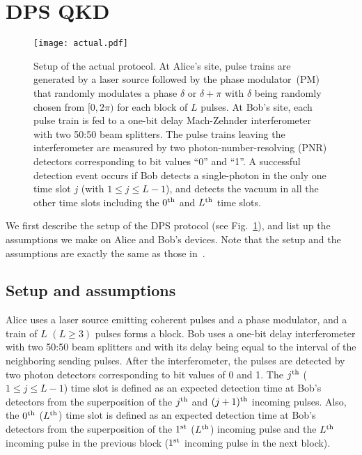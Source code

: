 \documentclass[prl,twocolumn,superscriptaddress,nofootinbib]{revtex4}
\def\U#1{{\rm #1}}
\begin{document}
\section{DPS QKD}
\label{sec:DPSQKD}
\begin{figure*}[t]
  \centering
\texttt{[image: actual.pdf]}
\caption{
  Setup of the actual protocol. At Alice's site, pulse trains are generated by a laser source followed by the phase modulator~(PM)
  that
  randomly modulates a phase $\delta$ or $\delta+\pi$ with $\delta$ being randomly chosen from $[0,2\pi)$ for each block of $L$ pulses. 
    At Bob's site, each pulse train is fed to a one-bit delay Mach-Zehnder interferometer with two
    50:50 beam splitters. 
    The pulse trains leaving the interferometer are measured by two photon-number-resolving (PNR) 
    detectors corresponding to bit values ``0'' and ``1''.
    A successful detection event occurs if Bob detects a single-photon 
    in the only one time slot $j$ (with $1\leq j\leq L-1$), and detects the vacuum in all the other time slots
    including the $0^{\U{th}}$ and $L^{\U{th}}$ time slots. 
  }
  \label{fig:actual}
          \end{figure*}
We first describe the setup of the DPS protocol (see Fig.~\ref{fig:actual}),
and list up the assumptions we make on Alice and Bob's devices.
Note that the setup and the assumptions are exactly the same as those in~\cite{Kiyoshi2012dps}.


\subsection{Setup and assumptions}
\label{sec:setup}
Alice uses a laser source emitting coherent pulses and a phase modulator, and a train of $L$ $(L\ge3)$ pulses forms a block. 
Bob uses a one-bit delay interferometer with two 50:50 beam splitters and with
its delay being equal to the interval of the neighboring sending pulses. 
After the interferometer, the pulses are detected by two photon detectors corresponding to bit values of 0 and 1.
The $j^{\U{th}}$ ($1\le j\le L-1$) time slot is defined as an expected detection time
at Bob's detectors from the superposition of the $j^{\U{th}}$ and $(j+1)^{\U{th}}$ incoming pulses.
Also, the $0^{\U{th}}$ ($L^{\U{th}}$) time slot is defined as an expected detection time at Bob's detectors
from the superposition of the $1^{\U{st}}$ ($L^{\U{th}}$) incoming pulse and the $L^{\U{th}}$
incoming pulse in the previous block ($1^{\U{st}}$ incoming pulse in the next block). 
\end{document}
